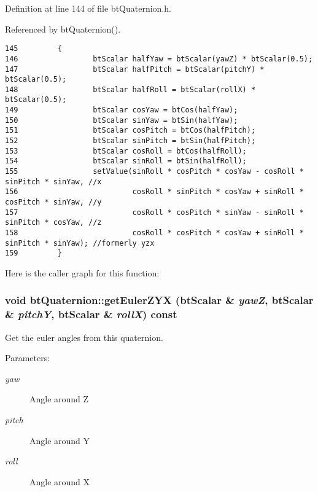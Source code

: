 Definition at line 144 of file btQuaternion.h.

Referenced by btQuaternion().

\begin{Code}\begin{verbatim}145         {
146                 btScalar halfYaw = btScalar(yawZ) * btScalar(0.5);  
147                 btScalar halfPitch = btScalar(pitchY) * btScalar(0.5);  
148                 btScalar halfRoll = btScalar(rollX) * btScalar(0.5);  
149                 btScalar cosYaw = btCos(halfYaw);
150                 btScalar sinYaw = btSin(halfYaw);
151                 btScalar cosPitch = btCos(halfPitch);
152                 btScalar sinPitch = btSin(halfPitch);
153                 btScalar cosRoll = btCos(halfRoll);
154                 btScalar sinRoll = btSin(halfRoll);
155                 setValue(sinRoll * cosPitch * cosYaw - cosRoll * sinPitch * sinYaw, //x
156                          cosRoll * sinPitch * cosYaw + sinRoll * cosPitch * sinYaw, //y
157                          cosRoll * cosPitch * sinYaw - sinRoll * sinPitch * cosYaw, //z
158                          cosRoll * cosPitch * cosYaw + sinRoll * sinPitch * sinYaw); //formerly yzx
159         }
\end{verbatim}
\end{Code}




Here is the caller graph for this function:\hypertarget{classbt_quaternion_9aef6f3c621a0a8493d1545c7043f075}{
\subsubsection[getEulerZYX]{\setlength{\rightskip}{0pt plus 5cm}void btQuaternion::getEulerZYX (btScalar \& {\em yawZ}, \/  btScalar \& {\em pitchY}, \/  btScalar \& {\em rollX}) const}}
\label{classbt_quaternion_9aef6f3c621a0a8493d1545c7043f075}


Get the euler angles from this quaternion. 

\begin{Desc}
\item[Parameters:]
\begin{description}
\item[{\em yaw}]Angle around Z \item[{\em pitch}]Angle around Y \item[{\em roll}]Angle around X \end{description}
\end{Desc}


